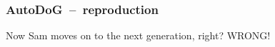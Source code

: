 \documentclass{beamer}
\newcommand{\linespace}{\vskip 0.25cm}
\begin{document}
\begin{frame}
\end{frame}

\begin{frame}
	\frametitle{AutoDoG~--~reproduction}
	\centering
	Now Sam moves on to the next generation, right?
	\pause
	\linespace\linespace
	\large WRONG!
\end{frame}
\end{document}
